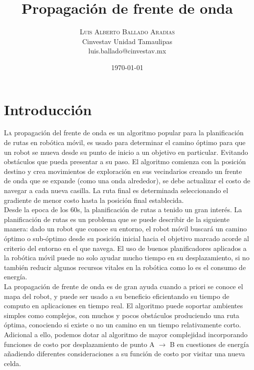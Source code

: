 \documentclass[oneside,twocolumn]{article}
\title{Propagación de frente de onda} %
\author{%
\textsc{Luis Alberto Ballado Aradias} \\%
\normalsize Cinvestav Unidad Tamaulipas \\ %
\normalsize luis.ballado@cinvestav.mx %
}
\date{\today} %
\begin{document}
\maketitle



    
\section{Introducción}

\lettrine[nindent=0em,lines=3]{L} a propagación del frente de onda es un algoritmo popular para la planificación de rutas en robótica móvil, es usado para determinar el camino óptimo para que un robot se mueva desde su punto de inicio a un objetivo en particular. Evitando obstáculos que pueda presentar a su paso. El algoritmo comienza con la posición destino y crea movimientos de exploración en sus vecindarios creando un frente de onda que se expande (como una onda alrededor), se debe actualizar el costo de navegar a cada nueva casilla. La ruta final es determinada seleccionando el gradiente de menor costo hasta la posición final establecida.\\

Desde la epoca de los 60s, la planificación de rutas a tenido un gran interés. La planificación de rutas es un problema que se puede describir de la siguiente manera: dado un robot que conoce su entorno, el robot móvil buscará un camino óptimo o sub-óptimo desde su posición inicial hacia el objetivo marcado acorde al criterio del entorno en el que navega. El uso de buenos planificadores aplicados a la robótica móvil puede no solo ayudar mucho tiempo en su desplazamiento, si no también reducir algunos recursos vitales en la robótica como lo es el consumo de energía.\\

La propagación de frente de onda es de gran ayuda cuando a priori se conoce el mapa del robot, y puede ser usado a su beneficio eficientando su tiempo de computo en aplicaciones en tiempo real. El algoritmo puede soportar ambientes simples como complejos, con muchos y pocos obstáculos produciendo una ruta óptima, conociendo si existe o no un camino en un tiempo relativamente corto. Adicional a ello, podemos dotar al algoritmo de mayor complejidad incorporando funciones de costo por desplazamiento de punto A $\rightarrow$ B en cuestiones de energía añadiendo diferentes consideraciones a su función de costo por visitar una nueva celda.\\
\end{document}
